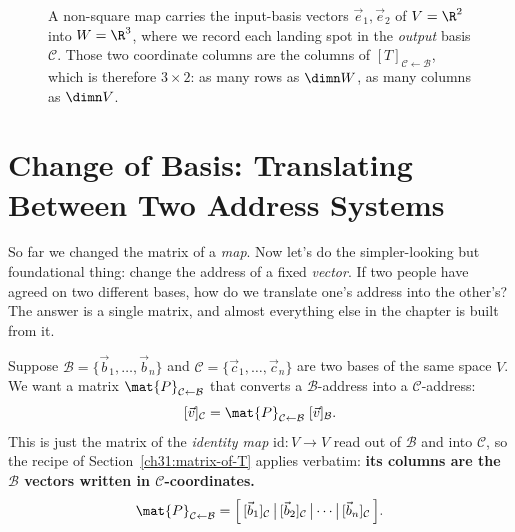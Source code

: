 \begin{figure}[H]
\centering
{}
\caption{A non-square map carries the input-basis vectors $\vec{e}_1,\vec{e}_2$
of $V=\R^2$ into $W=\R^3$, where we record each landing spot in the
\emph{output} basis $\mathcal{C}$. Those two coordinate columns are the columns of
$[T]_{\mathcal{C}\leftarrow\mathcal{B}}$, which is therefore $3\times 2$: as many
rows as $\dimn W$, as many columns as $\dimn V$.}
\label{ch31:fig-nonsquare}
\end{figure}

\section{Change of Basis: Translating Between Two Address Systems}
\label{ch31:change-of-basis}

So far we changed the matrix of a \emph{map}. Now let's do the simpler-looking but
foundational thing: change the address of a fixed \emph{vector}. If two people
have agreed on two different bases, how do we translate one's address into the
other's? The answer is a single matrix, and almost everything else in the chapter
is built from it.

Suppose $\mathcal{B}=\{\vec{b}_1,\dots,\vec{b}_n\}$ and
$\mathcal{C}=\{\vec{c}_1,\dots,\vec{c}_n\}$ are two bases of the same space $V$.
We want a matrix $\mat{P}_{\mathcal{C}\leftarrow\mathcal{B}}$ that converts a
$\mathcal{B}$-address into a $\mathcal{C}$-address:
\[
  [\vec{v}]_{\mathcal{C}} = \mat{P}_{\mathcal{C}\leftarrow\mathcal{B}}\;[\vec{v}]_{\mathcal{B}}.
\]
This is just the matrix of the \emph{identity map} $\mathrm{id}:V\to V$ read out of
$\mathcal{B}$ and into $\mathcal{C}$, so the recipe of Section~\ref{ch31:matrix-of-T}
applies verbatim: \textbf{its columns are the $\mathcal{B}$ vectors written in
$\mathcal{C}$-coordinates.}
\[
  \mat{P}_{\mathcal{C}\leftarrow\mathcal{B}}
  = \Big[\,[\vec{b}_1]_{\mathcal{C}}\,\big|\,[\vec{b}_2]_{\mathcal{C}}\,\big|\cdots\big|\,[\vec{b}_n]_{\mathcal{C}}\,\Big].
\]

